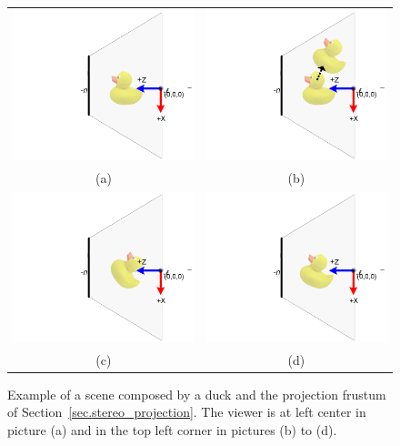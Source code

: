 \begin{figure}
\centering
\begin{tabular}{|c|c|}
\hline
\includegraphics[width=0.45\linewidth,keepaspectratio=true]{figs/scene01.png}
&
\includegraphics[width=0.45\linewidth,keepaspectratio=true]{figs/scene02.png}
\\
(a)&(b)\\ \hline
\includegraphics[width=0.45\linewidth,keepaspectratio=true]{figs/scene03.png}
&
\includegraphics[width=0.45\linewidth,keepaspectratio=true]{figs/scene04.png}
\\ 
(c)&(d)\\ \hline
\end{tabular}
\caption{Example of a scene composed by a duck and the projection frustum of Section~\ref{sec.stereo_projection}. The viewer is at left center in picture (a)  and in the top left corner in pictures (b) to (d).}
\label{fig.transformation}
\end{figure}
\fi






